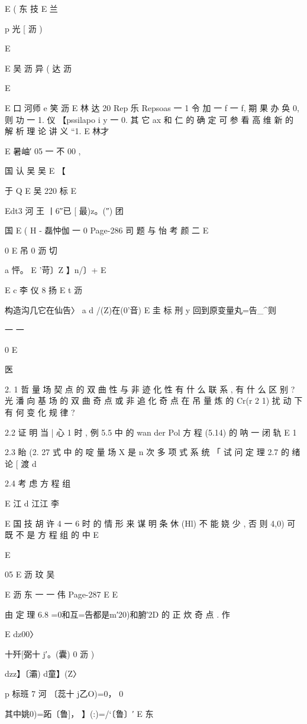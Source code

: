 {{{{{{{{{{{{{{E ( 东
技
E 兰

p 光 [ 沥 )

E

E 吴 沥 异 ( 达 沥

E

E 口 河师 e 笑 沥
E 林 达 20
Rep 乐 Repsoas 一 1 令 加 一 f 一 f, 期 果 办 奂 0, 则 功 一 1. 仪
【pssilapo i y
一 0. 其 它 ax 和 仁 的 确 定 可 参 看 高 维 新 的 解 析 理 论 讲 义 “1.
E 林才

E 暑岫′ 05 一 不 00 ,

国 认 吴 吴
E
【

于 Q E 吴 220 标
E

Edt3 河 王 丨6″已 [ 最)z。(″) 团

国
E ( H - 磊忡伽 一 0
Page-286
司 题 与 怡 考 颜 二 E

0
E 吊 0 沥 切

a 怦。 E '苛〕Z 】n/〕+ E

E c 李 仪 8 扬
E t 沥

构造沟几它在仙告〉 a d /(Z)在(0'音)
E 圭 标 刑 y 回到原变量丸=告_^则

一 一

0
E

医

2. 1 哲 量 场 契 点 的 双 曲 性 与 非 迹 化 性 有 什 么 联 系 , 有 什 么 区 别 ? 光 潘 向
基 场 的 双 曲 奇 点 或 非 追 化 奇 点 在 吊 量 炼 的 Cr(r 2 1) 扰 动 下 有 何 变 化 规 律 ?

2.2 证 明 当 | 心 1 时 , 例 5.5 中 的 wan der Pol 方 程 (5.14) 的 呐 一 闭 轨
E 1

2.3 眙 (2. 27 式 中 的 啶 量 场 X 是 n 次 多 项 式 系 统 「 试 问 定 理 2.7 的 绪 论
[ 渡 d

2.4 考 虑 方 程 组

E 江 d 江江 李

E 国 技 胡 许
4 一 6 时 的 情 形 来 谋 明 条 休 (Hl) 不 能 娆 少 , 否 则 4,0) 可 既 不 是 方 程 组 的 中
E

E

05 E 沥 玟 吴

E 沥 东 一 一 伟
Page-287
E E

由 定 理 6.8 =0和互=告都是m′20)和腑′2D 的 正 炊 奇 点 . 作

E
dz00〉

十歼[弼十 j′。(囊) 0 沥 )

dzz】〔灞) d童】(Z〉

p 标班 7 河 〔蕊十 j乙O)=0， 0

其中姚0)=跖〔鲁]， 】(:)=/`〔鲁〕′ E 东

}}}}}}}}}}}}}}
